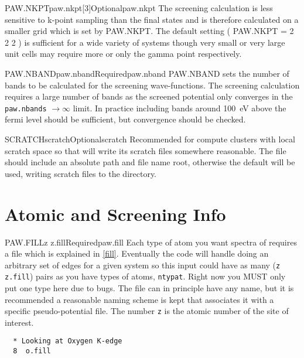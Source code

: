 \documentclass[11pt]{report}
\begin{document}
\begin{Card}{PAW.NKPT}{paw.nkpt[3]}{Optional}{paw.nkpt}
The screening calculation is less sensitive to k-point sampling than the final states and is therefore calculated on a smaller grid which is set by PAW.NKPT. The default setting ( PAW.NKPT = 2 2 2 ) is sufficient for a wide variety of systems though very small or very large unit cells may require more or only the gamma point respectively. 
\end{Card}

\begin{Card}{PAW.NBAND}{paw.nband}{Required}{paw.nband}
PAW.NBAND sets the number of bands to be calculated for the screening wave-functions. The screening calculation requires a large number of bands as the screened potential only converges in the \texttt{paw.nbands} $\rightarrow \infty$ limit. In practice including bands around 100~eV above the fermi level should be sufficient, but convergence should be checked. 
\end{Card}

\begin{Card}{SCRATCH}{scratch}{Optional}{scratch}
Recommended for compute clusters with local scratch space so that  will write its scratch files somewhere reasonable. The file  should include an absolute path and file name root, otherwise the default  will be used, writing scratch files to the  directory.
\end{Card}


\section{Atomic and Screening Info}
\label{sec:AS-Info}

\begin{Card}{PAW.FILL}{z z.fill}{Required}{paw.fill}
Each type of atom you want spectra of requires a  file which is explained in \ref{fill}. Eventually the code will handle doing an arbitrary set of edges for a given system so this input could have as many (\texttt{z} \texttt{z.fill}) pairs as you have types of atoms, \texttt{ntypat}. Right now you MUST only put one type here due to bugs. The file  can in principle have any name, but it is recommended a reasonable naming scheme is kept that associates it with a specific pseudo-potential file. The number \texttt{z} is the atomic number of the site of interest.

\begin{verbatim}
  * Looking at Oxygen K-edge
  8  o.fill
\end{verbatim}
\end{Card}
\end{document}
